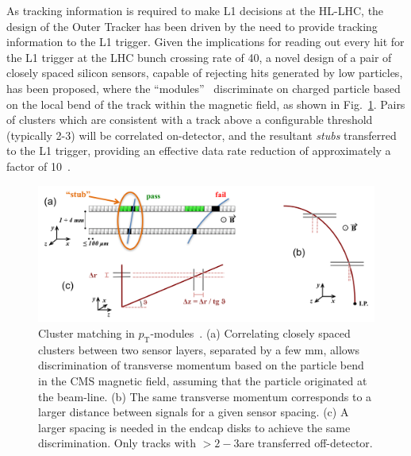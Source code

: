 As tracking information is required to make L1 decisions at the HL-LHC, the design of the Outer Tracker has been driven by the need to provide tracking information to the L1 trigger.
Given the implications for reading out every hit for the L1 trigger at the LHC bunch crossing rate of 40\MHz, a novel design of a pair of closely spaced silicon sensors, capable of rejecting hits generated by low \pT particles, has been proposed, where the ``\pT modules''~\cite{jjonespixel,markthesis} discriminate on charged particle \pT based on the local bend of the track within the magnetic field, as shown in Fig.~\ref{fig:stubs}.
Pairs of clusters which are consistent with a track \pT above a configurable threshold (typically 2-3\GeV) will be correlated on-detector, and the resultant \emph{stubs} transferred to the L1 trigger, providing an effective data rate reduction of approximately a factor of 10~\cite{mpessimperf,2dptmoduleconcept}.

\begin{figure}[!t]
\centering
\includegraphics[width=5in]{figs/tk-upgrade/pTsketches.png}
\caption{Cluster matching in $p_\mathrm{T}$-modules~\cite{P2TrackerTDR}. (a) Correlating closely spaced clusters between two sensor layers, separated by a few mm, allows discrimination of transverse momentum based on the particle bend in the CMS magnetic field, assuming that the particle originated at the beam-line. (b) The same transverse momentum corresponds to a larger distance between signals for a given sensor spacing. (c) A larger spacing is needed in the endcap disks to achieve the same discrimination. Only tracks with \pT $> 2-3$\GeVc are transferred off-detector.
}
\label{fig:stubs}
\end{figure}

